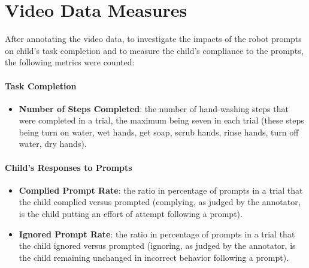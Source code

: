 \documentclass{ut-thesis}
\begin{document}

\section{Video Data Measures}
\label{sec:measures}
After annotating the video data, to investigate the impacts of the robot prompts on child's task completion and to measure the child's compliance to the prompts, the following metrics were counted:

\paragraph{Task Completion}
\begin{itemize}
	\item \textbf{Number of Steps Completed}: the number of hand-washing steps that were completed in a trial, the maximum being seven in each trial (these steps being turn on water, wet hands, get soap, scrub hands, rinse hands, turn off water, dry hands).
\end{itemize}

\paragraph{Child's Responses to Prompts}
\begin{itemize}
	\item \textbf{Complied Prompt Rate}: the ratio in percentage of prompts in a trial that the child complied versus prompted (complying, as judged by the annotator, is the child putting an effort of attempt following a prompt).
	\item \textbf{Ignored Prompt Rate}: the ratio in percentage of prompts in a trial that the child ignored versus prompted (ignoring, as judged by the annotator, is the child remaining unchanged in incorrect behavior following a prompt).
\end{itemize}

\end{document}
